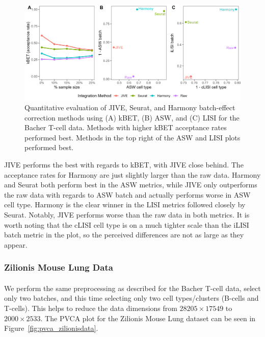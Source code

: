 \documentclass[unnumsec,webpdf,contemporary,large]{oup-authoring-template}%
\theoremstyle{thmstyleone}%
\theoremstyle{thmstyletwo}%
\theoremstyle{thmstylethree}%
\begin{document}
\begin{figure}[ht]
    \centering 
    \includegraphics[width=1\columnwidth]{metrics_bacherdata} 
    \caption[Metrics for the Bacher T-Cell Data]{Quantitative evaluation of JIVE, Seurat, and Harmony batch-effect correction methods using (A) kBET, (B) ASW, and (C) LISI for the Bacher T-cell data. Methods with higher kBET acceptance rates performed best. Methods in the top right of the ASW and LISI plots performed best.}
    \label{fig:metrics_bacherdata} 
\end{figure}

JIVE performs the best with regards to kBET, with JIVE close behind. The acceptance rates for Harmony are just slightly larger than the raw data. Harmony and Seurat both perform best in the ASW metrics, while JIVE only outperforms the raw data with regards to ASW batch and actually performs worse in ASW cell type. Harmony is the clear winner in the LISI metrics followed closely by Seurat. Notably, JIVE performs worse than the raw data in both metrics. It is worth noting that the cLISI cell type is on a much tighter scale than the iLISI batch metric in the plot, so the perceived differences are not as large as they appear.

\subsubsection*{Zilionis Mouse Lung Data}

\paragraph*{}
We perform the same preprocessing as described for the Bacher T-cell data, select only two batches, and this time selecting only two cell types/clusters (B-cells and T-cells). This helps to reduce the data dimensions from $28205 \times 17549$ to $2000 \times 2533$. The PVCA plot for the Zilionis Mouse Lung dataset can be seen in Figure~\ref{fig:pvca_zilionisdata}.
\end{document}
